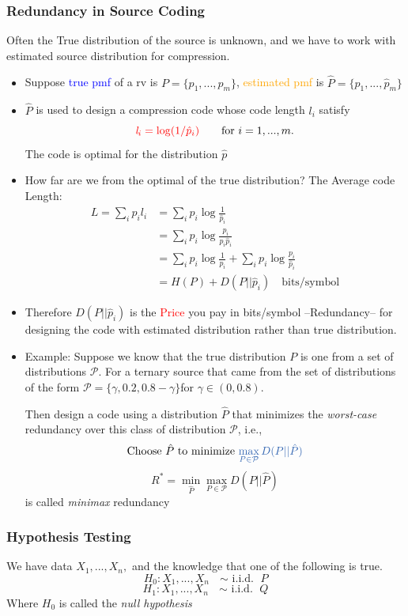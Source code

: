 \documentclass[12pt]{article}
\begin{document}
\subsubsection{Redundancy in Source Coding}
Often the \textcolor{blue1}{True distribution} of the source is unknown, and we have to work with estimated source distribution for compression.
\begin{itemize}
\item Suppose \textcolor{blue}{true pmf} of a rv is $P = \{ p_1,...,p_m\}$, \textcolor{orange}{estimated pmf} is $\hat{P} = \{ \hat{p}_1,...,\hat{p}_m\}$
\item $\hat{P}$ is used to design a compression code whose code length $\mathit{l}_i$ satisfy
\[
\textcolor{red}{ \mathit{l}_i = \log(1/\hat{p}_i) }\qquad \textrm{for } i=1,...,m.
\]
The code is optimal for the distribution $\hat{p}$
\item How far are we from the optimal of the \textcolor{blue1}{true distribution}?
The Average code Length:
\begin{align*}
L = \sum_ip_i\mathit{l}_i & = \sum_{i}p_i \log \frac{1}{\hat{p}_i} \\
& = \sum_{i}p_i \log\frac{p_i}{p_i\hat{p}_i} \\
& = \sum_{i}p_i \log\frac{1}{p_i} + \sum_{i}p_i \log\frac{p_i}{\hat{p}_i} \\
& = H(P) + D(P||\hat{p}_i) \quad \textrm{bits/symbol}
\end{align*}
\item Therefore  $D(P||\hat{p}_i)$ is the \textcolor{red}{Price} you pay in bits/symbol --Redundancy-- for designing the code with estimated distribution rather than true distribution.

\item Example:  
Suppose we know that the true distribution $P$ is one from a set of distributions $\mathcal{P}$. For a ternary source that came from the set of distributions of the form $\mathcal{P}= \{ \gamma,0.2,0.8-\gamma\}$for $\gamma \in (0,0.8)$.

Then design a code using a distribution $\hat{P}$ that minimizes the \textit{worst-case} redundancy over this class of distribution $\mathcal{P}$, i.e.,
\[
\textrm{Choose } \hat{P} \textrm{ to minimize } \textcolor{blue1}{\max_{P\in \mathcal{P}} D(P||\hat{P})} 
\]
\[
R^* = \min_{\hat{P}} \max_{P\in \mathcal{P}} D(P||\hat{P})
\]
is called \textit{minimax} redundancy
\end{itemize}

\subsubsection{Hypothesis Testing}
We have data $X_1,...,X_n,$ and the knowledge that one of the following is true.
\[
H_0: X_1,...,X_n \textrm{ $\sim$ i.i.d. } P
\]
\[
H_1: X_1,...,X_n \textrm{ $\sim$ i.i.d. } Q
\]
Where $H_0$ is called the  \emph{null hypothesis} \vspace{1.5mm}
\end{document}
